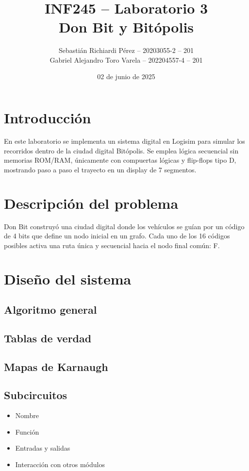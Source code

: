 \documentclass[12pt]{article}
\title{\textbf{INF245 – Laboratorio 3} \\ Don Bit y Bitópolis}
\author{
    Sebastián Richiardi Pérez – 20203055-2 – 201\\
    Gabriel Alejandro Toro Varela – 202204557-4 – 201
}
\date{02 de junio de 2025}
\begin{document}
\maketitle

\section{Introducción}
En este laboratorio se implementa un sistema digital en Logisim para simular los recorridos dentro de la ciudad digital Bitópolis. Se emplea lógica secuencial sin memorias ROM/RAM, únicamente con compuertas lógicas y flip-flops tipo D, mostrando paso a paso el trayecto en un display de 7 segmentos.

\section{Descripción del problema}
Don Bit construyó una ciudad digital donde los vehículos se guían por un código de 4 bits que define un nodo inicial en un grafo. Cada uno de los 16 códigos posibles activa una ruta única y secuencial hacia el nodo final común: F.

\section{Diseño del sistema}

\subsection{Algoritmo general}

\subsection{Tablas de verdad}

\subsection{Mapas de Karnaugh}

\subsection{Subcircuitos}

\begin{itemize}
    \item Nombre
    \item Función
    \item Entradas y salidas
    \item Interacción con otros módulos
\end{itemize}
\end{document}

